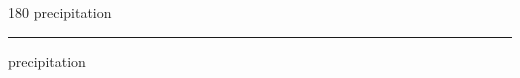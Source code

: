 
\begin{frame}
\begin{center}
\begin{turn}{180}
{\fontsize{2.5cm}{1em}\selectfont precipitation}
\end{turn}
\vspace{1em}\par  
\hrule
\vspace{1em}\par  
{\fontsize{2.5cm}{1em}\selectfont precipitation}
\end{center}
\end{frame}
